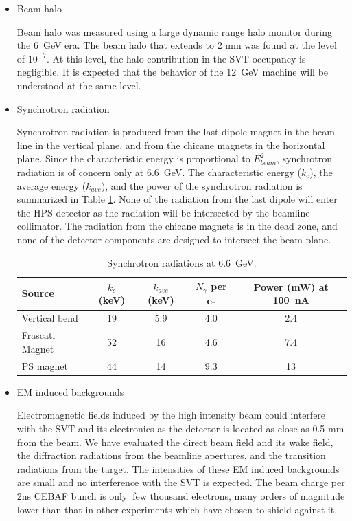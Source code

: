 \begin{itemize}
\item
Beam halo

Beam halo was measured using a large dynamic range halo monitor during the 6~GeV era. The beam halo 
that extends to 2 mm was found at the level of $10^{-7}$. At this level, the halo contribution in 
the SVT occupancy is negligible. It is expected that the behavior of the 12~GeV machine will be
understood at the same level.

\item
Synchrotron radiation

Synchrotron radiation is produced from the last dipole magnet in the beam line in the vertical 
plane, and from the chicane magnets in the horizontal plane. Since the characteristic energy is 
proportional to $E_{beam}^2$, synchrotron radiation is of concern 
only at 6.6~GeV. The characteristic energy ($k_c$),
the average energy ($k_{ave}$), and the power of the synchrotron radiation is summarized in 
Table \ref{tab:sync}.
None of the radiation from the last dipole will enter the HPS detector as the radiation will be intersected 
by the beamline collimator. The radiation from the chicane magnets is in the dead zone, and
none of the detector components are designed to intersect the beam plane.   

\begin{table}[ht]
\begin{center}
\begin{tabular}{|l|c|c|c|c|} \hline
  Source & $k_c$ (keV) & $k_{ave}$ (keV) & $N_\gamma$ per e- & Power (mW) at 100~nA \\ \hline
  Vertical bend & 19 & 5.9 & 4.0 & 2.4 \\ \hline
  Frascati Magnet & 52 & 16 & 4.6 & 7.4 \\ \hline
  PS magnet   & 44 & 14 & 9.3 & 13 \\ \hline
\end{tabular}
\end{center}
\caption{\small{Synchrotron radiations at 6.6~GeV.}}
\label{tab:sync}
\end{table}


\item
EM induced backgrounds

Electromagnetic fields induced by the high intensity beam could interfere with the SVT and its electronics
as the detector is located as close as 0.5 mm from the beam. We have evaluated the direct beam field and its wake 
field, the diffraction radiations from the beamline apertures, and the transition radiations from
the target. The intensities of these EM induced backgrounds are small and no interference with the SVT is expected. The beam charge per 2ns CEBAF bunch is only $~$few thousand electrons, many orders of magnitude lower than that in other experiments which have chosen to shield against it.
 
\end{itemize}

